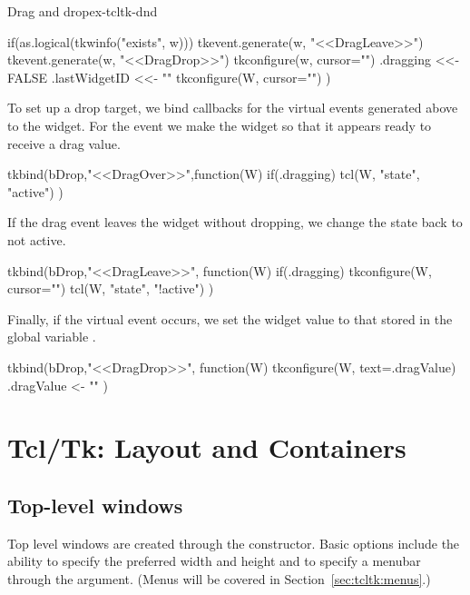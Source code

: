 \begin{example}{Drag and drop}{ex-tcltk-dnd}
\begin{Schunk}
\begin{Sinput}
{   if(as.logical(tkwinfo("exists", w))) {
     tkevent.generate(w, "<<DragLeave>>")
     tkevent.generate(w, "<<DragDrop>>")
     tkconfigure(w, cursor="")
   }
   .dragging <<- FALSE
   .lastWidgetID <<- "" 
   tkconfigure(W, cursor="")
 })
\end{Sinput}
\end{Schunk}
%
%
To set up a drop target, we bind callbacks for the virtual events
generated above to the widget. For the  event
we make the widget  so that it appears ready to receive a
drag value.
\begin{Schunk}
\begin{Sinput}
 tkbind(bDrop,"<<DragOver>>",function(W) {
   if(.dragging) 
     tcl(W, "state", "active")
 })
\end{Sinput}
\end{Schunk}
%
If the drag event leaves the widget without dropping, we change the
state back to not active.
\begin{Schunk}
\begin{Sinput}
 tkbind(bDrop,"<<DragLeave>>", function(W) {
   if(.dragging)  {
     tkconfigure(W, cursor="")
     tcl(W, "state", "!active")  
    }
 })
\end{Sinput}
\end{Schunk}
%
Finally, if the  virtual event occurs, we set
the widget value to that stored in the global variable
.
\begin{Schunk}
\begin{Sinput}
 tkbind(bDrop,"<<DragDrop>>", function(W) {
   tkconfigure(W, text=.dragValue)
   .dragValue <- ""
 })
\end{Sinput}
\end{Schunk}
\end{example}



\chapter{Tcl/Tk: Layout and Containers}
\label{sec:tcltk:basic-containers}


\section{Top-level windows}
\label{sec:tcltk:top-level-windows}

Top level windows are created through the 
constructor. Basic options include the ability to specify the
preferred width and height and to specify a menubar through
the  argument. (Menus will be covered in
Section~\ref{sec:tcltk:menus}.)


